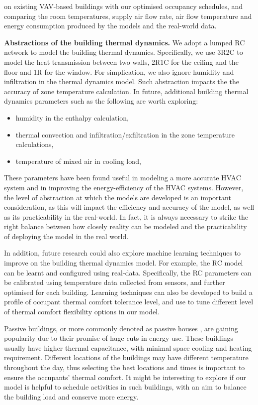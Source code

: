 \noindent on existing VAV-based buildings with our optimised occupancy schedules, and comparing the room temperatures, supply air flow rate, air flow temperature and energy consumption produced by the models and the real-world data. %

\textbf{Abstractions of the building thermal dynamics.} We adopt a lumped RC network to model the building thermal dynamics. Specifically, we use 3R2C to model the heat transmission between two walls, 2R1C for the ceiling and the floor and 1R for the window. For simplication, we also ignore humidity and infiltration in the thermal dynamics model. Such abstraction impacts the the accuracy of zone temperature calculation. In future, additional building thermal dynamics parameters such as the following are worth exploring: 
\begin{itemize}
	\item humidity in the enthalpy calculation,	
	\item thermal convection and infiltration/exfiltration in the zone temperature calculations,	
	\item temperature of mixed air in cooling load,		
\end{itemize}
These parameters have been found useful in modeling a more accurate HVAC system and in improving the energy-efficiency of the HVAC systems. However, the level of abstraction at which the models are developed is an important consideration, as this will impact the efficiency and accuracy of the model, as well as its practicability in the real-world. In fact, it is always necessary to strike the right balance between how closely reality can be modeled and the practicability of deploying the model in the real world.

In addition, future research could also explore machine learning techniques to improve on the building thermal dynamics model. For example, the RC model can be learnt and configured using real-data. Specifically, the RC parameters can be calibrated using temperature data collected from sensors, and further optimised for each building. Learning techniques can also be developed to build a profile of occupant thermal comfort tolerance level, and use to tune different level of thermal comfort flexibility options in our model.

Passive buildings, or more commonly denoted as passive houses \citep{henze2004evaluation,sadineni2011passive}, are gaining popularity due to their promise of huge cuts in energy use. These buildings usually have higher thermal capacitance, with minimal space cooling and heating requirement. Different locations of the buildings may have different temperature throughout the day, thus selecting the best locations and times is important to ensure the occupants' thermal comfort. It might be interesting to explore if our model is helpful to schedule activities in such buildings, with an aim to balance the building load and conserve more energy. 

